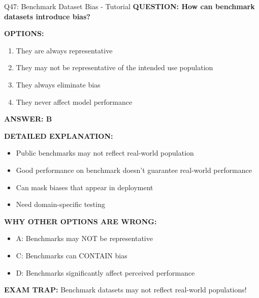 \documentclass[8pt]{beamer}
\begin{document}
	\begin{frame}{Q47: Benchmark Dataset Bias - Tutorial}
		\fontsize{6.5}{7.5}\selectfont
		\textbf{QUESTION: How can benchmark datasets introduce bias?}
		
		\vspace{0.1cm}
		\textbf{OPTIONS:}
		\begin{enumerate}
			\item They are always representative
			\item They may not be representative of the intended use population
			\item They always eliminate bias
			\item They never affect model performance
		\end{enumerate}
		
		\vspace{0.1cm}
		\textcolor{myblue}{\textbf{ANSWER: B}}
		
		\vspace{0.1cm}
		\textbf{DETAILED EXPLANATION:}
		\begin{itemize}
			\item Public benchmarks may not reflect real-world population
			\item Good performance on benchmark doesn't guarantee real-world performance
			\item Can mask biases that appear in deployment
			\item Need domain-specific testing
		\end{itemize}
		
		\vspace{0.1cm}
		\textcolor{myred}{\textbf{WHY OTHER OPTIONS ARE WRONG:}}
		\begin{itemize}
			\item \textcolor{myred}{A:} Benchmarks may NOT be representative
			\item \textcolor{myred}{C:} Benchmarks can CONTAIN bias
			\item \textcolor{myred}{D:} Benchmarks significantly affect perceived performance
		\end{itemize}
		
		\textcolor{myred}{\textbf{EXAM TRAP:}} Benchmark datasets may \textcolor{myblue}{not reflect real-world populations}!
	\end{frame}
	
\end{document}

